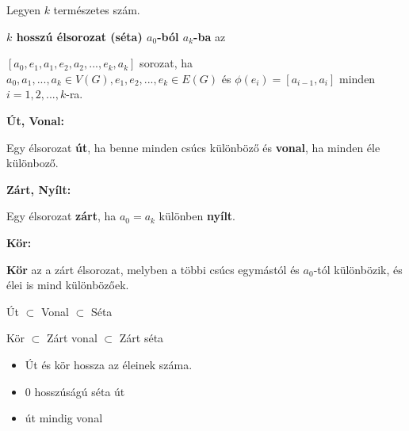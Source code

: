 \documentclass[10pt]{article}
\renewcommand{\\}{\par\noindent}
\begin{document}
\begin{frame}
\begin{tcolorbox}[title={Zárt, Nyílt élsorozat (Séta)}]
Legyen $k$ természetes szám.\\
\textbf{$k$ hosszú élsorozat (séta) $a_0$-ból $a_k$-ba} az\\
\smallskip
$[a_0, e_1, a_1, e_2, a_2, ..., e_k, a_k]$ sorozat, ha $a_0, a_1, ..., a_k \in V(G), e_1, e_2, ..., e_k \in E(G)$ és ${\phi}(e_i) = [a_{i - 1}, a_i]$ minden $i = 1, 2, ..., k$-ra.\\
\bigskip
\textbf{Út, Vonal:}\\
Egy élsorozat \textbf{út}, ha benne minden csúcs különböző és \textbf{vonal}, ha minden éle különboző.\\
\bigskip
\textbf{Zárt, Nyílt:}\\
Egy élsorozat \textbf{zárt}, ha $a_0 = a_k$ különben \textbf{nyílt}.\\
\bigskip
\textbf{Kör:}\\
\textbf{Kör} az a zárt élsorozat, melyben a többi csúcs egymástól és $a_0$-tól különbözik, és élei is mind különbözőek.\\
\bigskip
Út $\subset$ Vonal $\subset$ Séta\\
\medskip
Kör $\subset$ Zárt vonal $\subset$ Zárt séta
\end{tcolorbox}
\begin{tcolorbox}[title={Ész}]
\begin{itemize}
\item Út és kör hossza az éleinek száma.
\item 0 hosszúságú séta út
\item út mindig vonal
\end{itemize}
\end{tcolorbox}

\end{frame}
\end{document}
